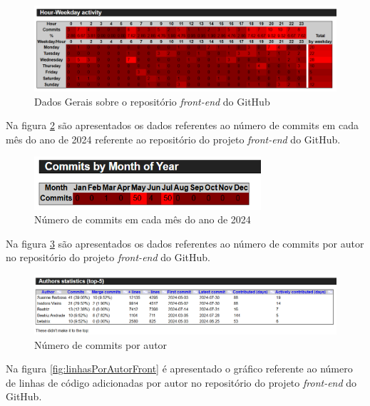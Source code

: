 \begin{figure}[ht]
        \centering
\includegraphics[width=1.0\textwidth]{images/commits-hora-semana-stats-front.png}
        \caption{Dados Gerais sobre o repositório \textit{front-end} do GitHub}
        \label{fig:commitsPorHoraFront}
    \end{figure}

Na figura \ref{fig:commitsPorMesFront} são apresentados os dados referentes ao número de commits em cada mês do ano de 2024 referente ao repositório do projeto \textit{front-end} do GitHub.

\begin{figure}[ht]
        \centering
\includegraphics[width=0.75\textwidth]{images/commits-mes-stats-front.png}
        \caption{Número de commits em cada mês do ano de 2024}
        \label{fig:commitsPorMesFront}
    \end{figure}

Na figura \ref{fig:commitsPorAutorFront} são apresentados os dados referentes ao número de commits por autor no repositório do projeto \textit{front-end} do GitHub.  

\begin{figure}[ht]
        \centering
\includegraphics[width=1.0\textwidth]{images/autor-stats-front.png}
        \caption{Número de commits por autor}
        \label{fig:commitsPorAutorFront}
    \end{figure}

\newpage

Na figura \ref{fig:linhasPorAutorFront} é apresentado o gráfico referente ao número de linhas de código adicionadas por autor no repositório do projeto \textit{front-end} do GitHub.  

